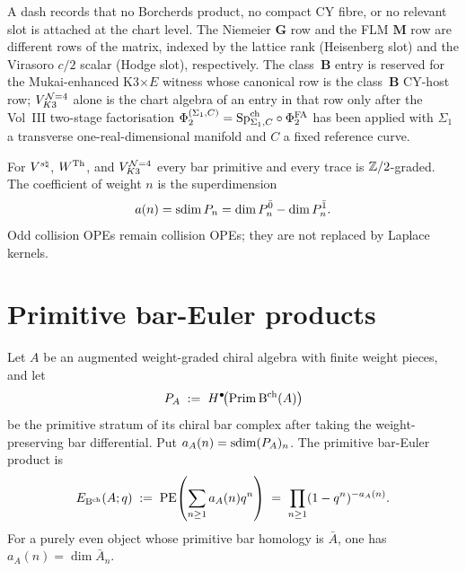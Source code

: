 \begin{remark}
A dash records that no Borcherds product, no compact CY fibre, or no
relevant slot is attached at the chart level. The Niemeier
$\mathbf G$ row and the FLM $\mathbf M$ row are different rows of the
matrix, indexed by the lattice rank (Heisenberg slot) and the Virasoro
$c/2$ scalar (Hodge slot), respectively.  The
class~$\mathbf B$ entry is reserved for the Mukai-enhanced K3$\times E$
witness whose canonical row is the class~$\mathbf B$ CY-host row;
$V_{K3}^{\mathcal N{=}4}$ alone is the chart algebra of an entry in that row only
after the Vol~III two-stage factorisation
$\Phi_2^{(\Sigma_1,C)}=\mathrm{Sp}^{\mathrm{ch}}_{\Sigma_1,C}\circ\Phi^{\mathrm{FA}}_2$ has been
applied with $\Sigma_1$ a transverse one-real-dimensional manifold and
$C$ a fixed reference curve.
\end{remark}

\begin{remark}
\label{rem:moonshine-bar-super-conv}
For $V^{s\natural}$, $W^{\mathrm{Th}}$, and $V_{K3}^{\mathcal N{=}4}$ every bar primitive and every
trace is $\mathbb Z/2$-graded.  The coefficient of weight $n$ is the
superdimension
\[
 a(n)=\operatorname{sdim} P_n=\dim P_n^{\bar 0}-\dim P_n^{\bar 1}.
\]
Odd collision OPEs remain collision OPEs; they are not replaced by
Laplace kernels.
\end{remark}

\section{Primitive bar-Euler products}
\label{sec:moonshine-master}

\begin{proposition}
\label{prop:bar-euler-hilbert}
Let $A$ be an augmented weight-graded chiral algebra with finite
weight pieces, and let
\[
 P_A
 \;:=\;
 H^\bullet\!\bigl(\operatorname{Prim}\mathrm B^{\mathrm{ch}}(A)\bigr)
\]
be the primitive stratum of its chiral bar complex after taking the
weight-preserving bar differential.  Put
$a_A(n)=\operatorname{sdim} (P_A)_n$.  The primitive bar-Euler product is
\begin{equation}
\label{eq:bar-euler-hilbert}
 E_{\mathrm B^{\mathrm{ch}}}(A;q)
 \;:=\;
 \operatorname{PE}\!\left(\sum_{n\geq 1} a_A(n)q^n\right)
 \;=\;
 \prod_{n\geq 1}(1-q^n)^{-a_A(n)} .
\end{equation}
For a purely even object whose primitive bar homology is $\bar A$,
one has $a_A(n)=\dim \bar A_n$.
\end{proposition}

